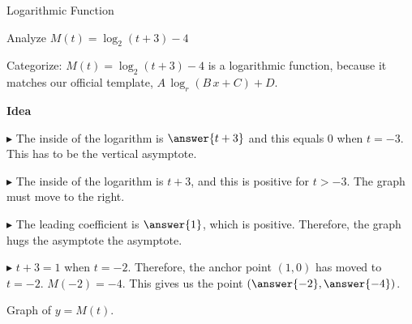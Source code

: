 \documentclass{ximera}
\begin{document}
\begin{example}  Logarithmic Function



Analyze   $M(t) = \log_2(t+3) - 4$ 


Categorize: $M(t) = \log_2(t+3) - 4$ is a logarithmic function, because it matches our official template, $A \, \log_r(B \, x + C) + D$. 


\textbf{\textcolor{blue!55!black}{Idea}} 

$\blacktriangleright$ The inside of the logarithm is $\answer{t+3}$ and this equals $0$ when $t=-3$.  This has to be the vertical asymptote.

$\blacktriangleright$ The inside of the logarithm is $t+3$, and this is positive for $t>-3$.  The graph must move to the right.

$\blacktriangleright$ The leading coefficient is $\answer{1}$, which is positive.  Therefore, the graph hugs the asymptote  the asymptote. 

$\blacktriangleright$ $t+3=1$ when $t=-2$. Therefore, the anchor point $(1,0)$ has moved to $t = -2$.  $M(-2) = -4$.  This gives us the point $\left( \answer{-2}, \answer{-4} \right)$.





Graph of $y = M(t)$.

\begin{image}
\end{image}
\end{example}
\end{document}
